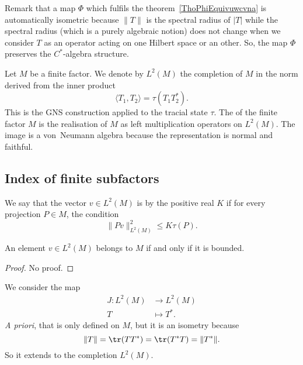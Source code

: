 Remark that a map $\Phi$ which fulfils the theorem~\ref{ThoPhiEquivuwcvna} is automatically isometric because $\| T \|$ is the spectral radius of $| T |$ while the spectral radius (which is a purely algebraic notion) does not change when we consider $T$ as an operator acting on one Hilbert space or an other. So, the map $\Phi$ preserves the $C^*$-algebra structure.

Let $M$ be a finite factor. We denote by $L^2(M)$\label{PgLdM} the completion of $M$ in the norm derived  from the inner product
\begin{equation}
	\langle T_1, T_2\rangle =\tau(T_1T_2^*).
\end{equation}
This is the GNS construction applied to the tracial state $\tau$. The  of the finite factor $M$ is the realisation of $M$ as left multiplication operators on $L^2(M)$. The image is a von~Neumann algebra because the representation is normal and faithful.


					\subsection{Index of finite subfactors}

We say that the vector $v\in L^2(M)$ is  by the positive real $K$ if for every projection $P\in M$, the condition
\begin{equation}
	\| Pv \|^2_{L^2(M)}\leq K\tau(P).
\end{equation}

\begin{lemma}
An element $v\in L^2(M)$ belongs to $M$ if and only if it is bounded.
\end{lemma}
\begin{proof}
No proof.
\end{proof}

We consider the map
\begin{equation}
\begin{aligned}
 J\colon L^2(M)&\to L^2(M) \\
   T&\mapsto T^*.
\end{aligned}
\end{equation}
\emph{A priori}, that is only defined on $M$, but it is an isometry because
\begin{equation}
	\| T \|=\tr(TT^*)=\tr(T^*T)=\| T^* \|.
\end{equation}
So it extends to the completion $L^2(M)$.

